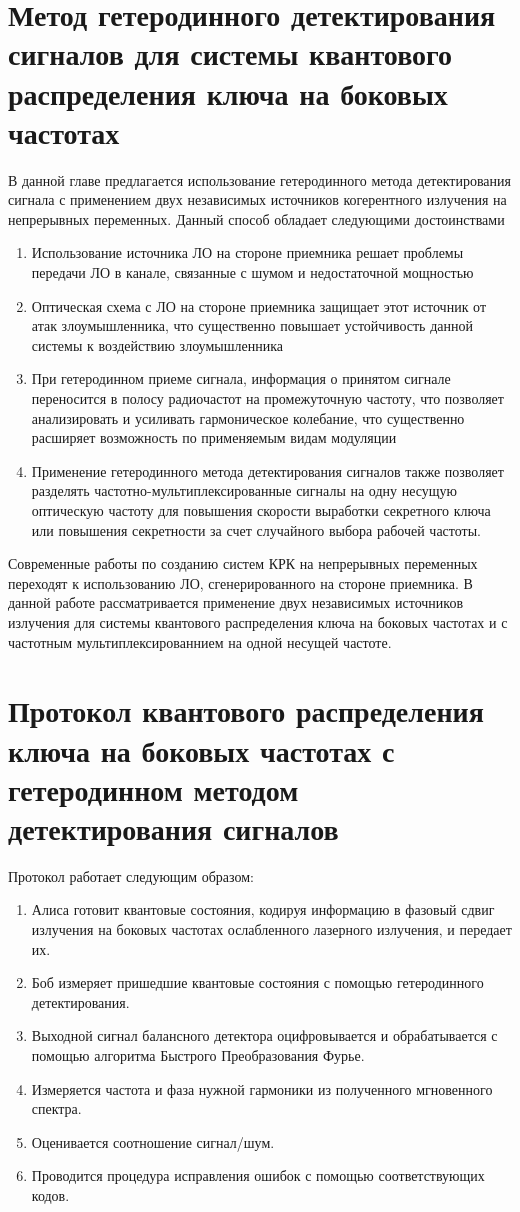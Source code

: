 \section{Метод гетеродинного детектирования сигналов для системы квантового распределения ключа на боковых частотах}\label{sec:ch3/sect1} 
В данной главе предлагается использование гетеродинного метода детектирования сигнала с применением двух независимых источников когерентного излучения на непрерывных переменных. Данный способ обладает следующими достоинствами
\begin{enumerate}
    \item Использование источника ЛО на стороне приемника решает проблемы передачи ЛО в канале, связанные с шумом и недостаточной мощностью
    \item Оптическая схема с ЛО на стороне приемника защищает этот источник от атак злоумышленника, что существенно повышает устойчивость данной системы к воздействию злоумышленника
    \item При гетеродинном приеме сигнала, информация о принятом сигнале переносится в полосу радиочастот на промежуточную частоту, что позволяет анализировать и усиливать гармоническое колебание, что существенно расширяет возможность по применяемым видам модуляции
    \item Применение гетеродинного метода детектирования сигналов также позволяет разделять частотно-мультиплексированные сигналы на одну несущую оптическую частоту для повышения скорости выработки секретного ключа или повышения секретности за счет случайного выбора рабочей частоты.
\end{enumerate}
Современные работы по созданию систем КРК на непрерывных переменных переходят к использованию ЛО, сгенерированного на стороне приемника. В данной работе рассматривается применение двух независимых источников излучения для системы квантового распределения ключа на боковых частотах и с частотным мультиплексированнием на одной несущей частоте.
\section{Протокол квантового распределения ключа на боковых частотах с гетеродинном методом детектирования сигналов}\label{sec:ch3/sect2}
Протокол работает следующим образом:
\begin{enumerate}
    \item Алиса готовит квантовые состояния, кодируя информацию в фазовый сдвиг излучения на боковых частотах ослабленного лазерного излучения, и передает их.
    \item Боб измеряет пришедшие квантовые состояния с помощью гетеродинного детектирования.
    \item Выходной сигнал балансного детектора оцифровывается и обрабатывается с помощью алгоритма Быстрого Преобразования Фурье.
    \item Измеряется частота и фаза нужной гармоники из полученного мгновенного спектра.
    \item Оценивается соотношение сигнал/шум.
    \item Проводится процедура исправления ошибок с помощью соответствующих кодов.
\end{enumerate}
